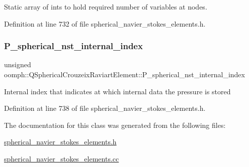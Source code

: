 Static array of ints to hold required number of variables at nodes. 



Definition at line 732 of file spherical\+\_\+navier\+\_\+stokes\+\_\+elements.\+h.

\mbox{\label{classoomph_1_1QSphericalCrouzeixRaviartElement_afe49582c1bb7d3b8adb0593baf75f228}} 
\subsubsection{\texorpdfstring{P\+\_\+spherical\+\_\+nst\+\_\+internal\+\_\+index}{P\_spherical\_nst\_internal\_index}}
{\footnotesize\ttfamily unsigned oomph\+::\+Q\+Spherical\+Crouzeix\+Raviart\+Element\+::\+P\+\_\+spherical\+\_\+nst\+\_\+internal\+\_\+index\hspace{0.3cm}{\ttfamily [protected]}}

Internal index that indicates at which internal data the pressure is stored 

Definition at line 738 of file spherical\+\_\+navier\+\_\+stokes\+\_\+elements.\+h.



The documentation for this class was generated from the following files\+:\begin{DoxyCompactItemize}
\item 
\hyperlink{spherical__navier__stokes__elements_8h}{spherical\+\_\+navier\+\_\+stokes\+\_\+elements.\+h}\item 
\hyperlink{spherical__navier__stokes__elements_8cc}{spherical\+\_\+navier\+\_\+stokes\+\_\+elements.\+cc}\end{DoxyCompactItemize}
